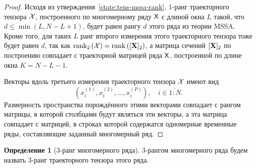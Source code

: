 \documentclass[specialist,
    substylefile=spbu.rtx,
    subf,href,colorlinks=true, 12pt]{disser}
\theoremstyle{plain}
\theoremstyle{definition}
\newtheorem{definition}{Определение}[section]
\theoremstyle{remark}
\begin{document}
    \begin{proof}
        Исходя из утверждения~\ref{state:tens-mssa-rank}, 1-ранг
        траекторного тензора $\mathcal{X}$, построенного по многомерному ряду $\mathsf{X}$ с длиной окна
        $L$ такой, что $d \leqslant\min(L, N-L+1)$,
        будет равен рангу $d$ этого ряда из теории MSSA.
        Кроме того, для таких $L$ ранг второго измерения этого траекторного тензора
        тоже будет равен $d$, так как $\operatorname{rank}_2\left(\mathcal{X}\right) =
        \operatorname{rank}\left([\mathbf{X}]_2\right)$,
        а матрица сечений $[\mathbf{X}]_2$ по построению совпадает с траекторной матрицей ряда $\mathsf{X}$, построенной по длине
        окна $K = N - L - 1$.

        Векторы вдоль третьего измерения траекторного тензора $\mathcal{X}$ имеют вид
        \[
            \left(x_i^{(1)}, x_i^{(2)}, \ldots, x_i^{(P)}\right), \quad i \in \overline{1:N}.
        \]
        Размерность пространства порождённого этими векторами совпадает с рангом матрицы,
        в которой столбцами будут являться эти векторы, а эта матрица совпадает с матрицей, в строках которой содержатся одномерные временные ряды, составляющие заданный многомерный ряд.
    \end{proof}

%
    \begin{definition}[3-ранг многомерного ряда]
        3-рангом многомерного ряда будем назвать 3-ранг траекторного тензора этого ряда.
    \end{definition}
\end{document}
